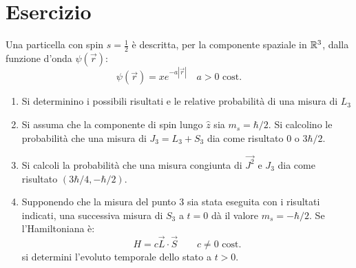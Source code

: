 \documentclass[../../FisicaTeorica.tex]{subfiles}
\begin{document}
\begin{comment}
Eravamo arrivati a:
\[
\underbrace{\hs_{j_1} \otimes \hs_{j_2}}_{\ket{j_1, j_2, m_1, m_2}} = \underbrace{\bigoplus_{j=|j_1-j_2|}^{j_1+j_2}\hs_j}_{\ket{J, M}}
\]
Dove:
\[
\ket{J, M}=\ket{j_1+j_2, j_1+j_2}=\ket{j_1, j_2, j_1, j_2}
\]
Applicando $J_- = J_-^{(1)}+J_-^{(2)}$:
\begin{align*}
\sqrt{(j_1+j_2)(j_1+j_2+1)-(j_1+j_2)(j_1+j_2-1)}\ket{j_1+j_2, j_1+j_2-1} = \\
\sqrt{j_1(j_1+1)-j_1(j_1-1)}\ket{j_1, j_2, j_1-1, j_2}+
\sqrt{j_2(j_2+1)-j_2(j_2-1)}\ket{j_1, j_2, j_1, j_2 -1}
\end{align*}
Se calcoliamo $\ket{j_1+j_2, m}$, 
\[
\braket{j_1+j_2, j_1+j_2-1|j_1+j_2-1, j_1+j_2-1}=0
\]
con la convenzione:
\[
\braket{j_1, j_2, j_1, j-j_1|j,j}\geq 0
\]
\end{comment}

\section{Esercizio \theEsercizio} 
Una particella con spin $s=\frac{1}{2}$ è descritta, per la componente spaziale in $\mathbb{R}^3$, dalla funzione d'onda $\psi(\vec{r})$:
\[
\psi(\vec{r})=xe^{-a|\vec{r}|}\quad a>0 \text{ cost.}
\]
\begin{enumerate}
\item Si determinino i possibili risultati e le relative probabilità di una misura di $L_3$
\item Si assuma che la componente di spin lungo $\hat{z}$ sia $m_s=\hbar/2$. Si calcolino le probabilità che una misura di $J_3 = L_3 + S_3$ dia come risultato $0$ o $3\hbar/2$.
\item Si calcoli la probabilità che una misura congiunta di $\vec{J^2}$ e $J_3$ dia come risultato $(3\hbar/4, -\hbar/2)$.
\item Supponendo che la misura del punto $3$ sia stata eseguita con i risultati indicati, una successiva misura di $S_3$ a $t=0$ dà il valore $m_s=-\hbar/2$. Se l'Hamiltoniana è:
\[
H=c\vec{L}\cdot \vec{S} \qquad c \neq 0\text{ cost.}
\]
si determini l'evoluto temporale dello stato a $t>0$.
\end{enumerate}
\end{document}
